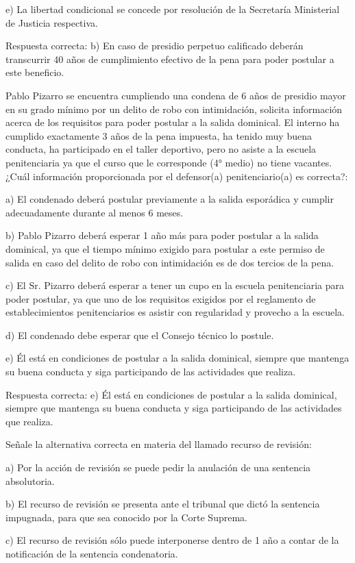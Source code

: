 \documentclass[letterpaper, 11pt]{article}
\begin{document}
e) La libertad condicional se concede por resolución de la Secretaría Ministerial de Justicia
respectiva.


Respuesta correcta:
b) En caso de presidio perpetuo calificado deberán transcurrir
40 años de cumplimiento efectivo de la pena para poder postular a este beneficio.


Pablo Pizarro se encuentra cumpliendo una condena de 6 años de presidio mayor en su
grado mínimo por un delito de robo con intimidación, solicita información acerca de los
requisitos para poder postular a la salida dominical. El interno ha cumplido exactamente 3
años de la pena impuesta, ha tenido muy buena conducta, ha participado en el taller
deportivo, pero no asiste a la escuela penitenciaria ya que el curso que le corresponde (4°
medio) no tiene vacantes. ¿Cuál información proporcionada por el defensor(a)
penitenciario(a) es correcta?:

a) El condenado deberá postular previamente a la salida esporádica y cumplir
adecuadamente durante al menos 6 meses.

b) Pablo Pizarro deberá esperar 1 año más para poder postular a la salida dominical, ya
que el tiempo mínimo exigido para postular a este permiso de salida en caso del delito de
robo con intimidación es de dos tercios de la pena.

c) El Sr. Pizarro deberá esperar a tener un cupo en la escuela penitenciaria para poder
postular, ya que uno de los requisitos exigidos por el reglamento de establecimientos
penitenciarios es asistir con regularidad y provecho a la escuela.

d) El condenado debe esperar que el Consejo técnico lo postule.

e) Él está en condiciones de postular a la salida dominical, siempre que mantenga su buena
conducta y siga participando de las actividades que realiza.

Respuesta correcta:
e) Él está en condiciones de postular a la salida dominical,
siempre que mantenga su buena conducta y siga participando de las actividades que
realiza.

Señale la alternativa correcta en materia del llamado recurso de revisión:

a) Por la acción de revisión se puede pedir la anulación de una sentencia
absolutoria.

b) El recurso de revisión se presenta ante el tribunal que dictó la sentencia
impugnada, para que sea conocido por la Corte Suprema.

c) El recurso de revisión sólo puede interponerse dentro de 1 año a contar de la
notificación de la sentencia condenatoria.
\end{document}
